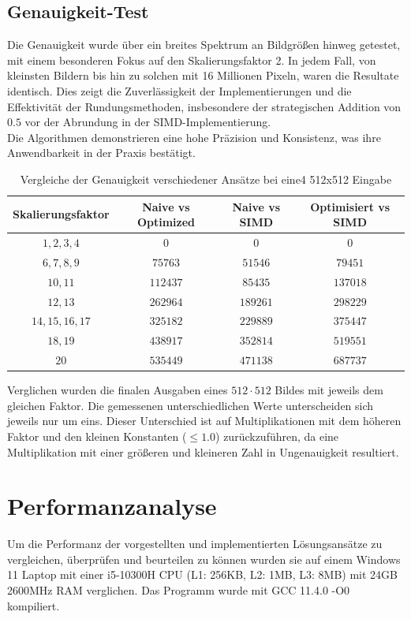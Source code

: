 \documentclass[course=erap]{aspdoc}
\begin{document}
\subsection{Genauigkeit-Test}
Die Genauigkeit wurde über ein breites Spektrum an Bildgrößen hinweg getestet, mit einem besonderen Fokus auf den Skalierungsfaktor 2. In jedem Fall, von kleinsten Bildern bis hin zu solchen mit 16 Millionen Pixeln, waren die Resultate identisch. Dies zeigt die Zuverlässigkeit der Implementierungen und die Effektivität der Rundungsmethoden, insbesondere der strategischen Addition von $0.5$ vor der Abrundung in der SIMD-Implementierung.\\
Die Algorithmen demonstrieren eine hohe Präzision und Konsistenz, was ihre Anwendbarkeit in der Praxis bestätigt.\\


\begin{table}[ht]
\centering
\begin{tabular}{|c|c|c|c|}
\hline
Skalierungsfaktor & Naive vs Optimized & Naive vs SIMD & Optimisiert vs SIMD \\ 
\hline
$1,2,3,4$ & $0$ & $0$ & $0$ \\
$6,7,8,9$ & $75763$ & $51546$ & $79451$ \\
$10,11$ & $112437$ & $85435$ & $137018$ \\
$12,13$ & $262964$ & $189261$ & $298229$ \\
$14,15,16,17$ & $325182$ & $229889$ & $375447$ \\
$18,19$ & $438917$ & $352814$ & $519551$ \\
$20$ & $535449$ & $471138$ & $687737$ \\
\hline
\end{tabular}
\caption{Vergleiche der Genauigkeit verschiedener Ansätze bei eine4 512x512 Eingabe}
\label{table:comparison}
\end{table}

\noindent
Verglichen wurden die finalen Ausgaben eines $512 \cdot 512$ Bildes mit jeweils dem gleichen Faktor. Die gemessenen unterschiedlichen Werte unterscheiden sich jeweils nur um eins. Dieser Unterschied ist auf Multiplikationen mit dem höheren Faktor und den kleinen Konstanten ($\leq 1.0$) zurückzuführen, da eine Multiplikation mit einer größeren und kleineren Zahl in Ungenauigkeit resultiert.

\section{Performanzanalyse}
Um die Performanz der vorgestellten und implementierten Lösungsansätze zu vergleichen, überprüfen und beurteilen zu können wurden sie auf einem Windows 11 Laptop mit einer i5-10300H CPU (L1: 256KB, L2: 1MB, L3: 8MB) mit 24GB 2600MHz RAM verglichen. Das Programm wurde mit GCC 11.4.0 -O0 kompiliert.
\end{document}
